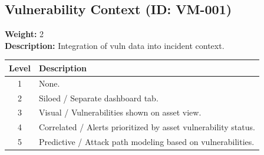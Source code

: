 \documentclass{article}
\begin{document}
\subsection{Vulnerability Context (ID: VM-001)}
\textbf{Weight:} 2 \\
\textbf{Description:} Integration of vuln data into incident context.
\vspace{0.3cm}
\begin{longtable}{|c|p{12cm}|}
\hline
\rowcolor{lightgray} \textbf{Level} & \textbf{Description} \\ \hline
1 & None. \\ \hline
2 & Siloed / Separate dashboard tab. \\ \hline
3 & Visual / Vulnerabilities shown on asset view. \\ \hline
4 & Correlated / Alerts prioritized by asset vulnerability status. \\ \hline
5 & Predictive / Attack path modeling based on vulnerabilities. \\ \hline
\end{longtable}
\vspace{0.5cm}
\end{document}
